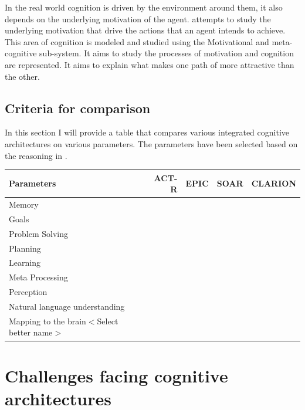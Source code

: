 In the real world cognition is driven by the environment around them,
it also depends on the underlying motivation of the agent. \clarion
attempts to study the underlying motivation that drive the
actions that an agent intends to achieve. This area of cognition is
modeled and studied using the Motivational and meta-cognitive
sub-system. It aims to study the processes of motivation and cognition
are represented\cite{Sun:2003aa}. It aims to explain what makes one
path of more attractive than the other. 



\subsection{Criteria for comparison}
In this section I will provide a table that compares various
integrated cognitive architectures on various parameters. The
parameters have been selected based on the reasoning in \cite{CambridgeJournals:207162}.

\begin{longtable}{lrrrr}
  \hline
  Parameters & ACT-R & EPIC & SOAR & CLARION \\
  \hline
  Memory & & & & \\
  Goals  & & & & \\
  Problem Solving  & & & & \\
  Planning  & & & & \\
  Learning   & & & & \\
  Meta Processing   & & & & \\
  Perception & & & & \\
  Natural language understanding & & & & \\
  Mapping to the brain$<$Select better name$>$ & & & & \\
  \hline
\end{longtable}


\section{Challenges facing cognitive architectures}

